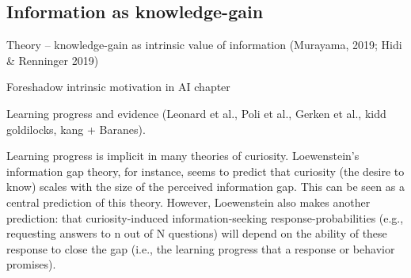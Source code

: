     \subsection{Information as knowledge-gain}

        Theory -- knowledge-gain as intrinsic value of information (Murayama, 2019; Hidi & Renninger 2019)

        Foreshadow intrinsic motivation in AI chapter

        Learning progress and evidence (Leonard et al., Poli et al., Gerken et al., kidd goldilocks, kang + Baranes).

        Learning progress is implicit in many theories of curiosity. Loewenstein's information gap theory, for instance, seems to predict that curiosity (the desire to know) scales with the size of the perceived information gap. This can be seen as a central prediction of this theory. However, Loewenstein also makes another prediction: that curiosity-induced information-seeking response-probabilities (e.g., requesting answers to n out of N questions) will depend on the ability of these response to close the gap (i.e., the learning progress that a response or behavior promises).
